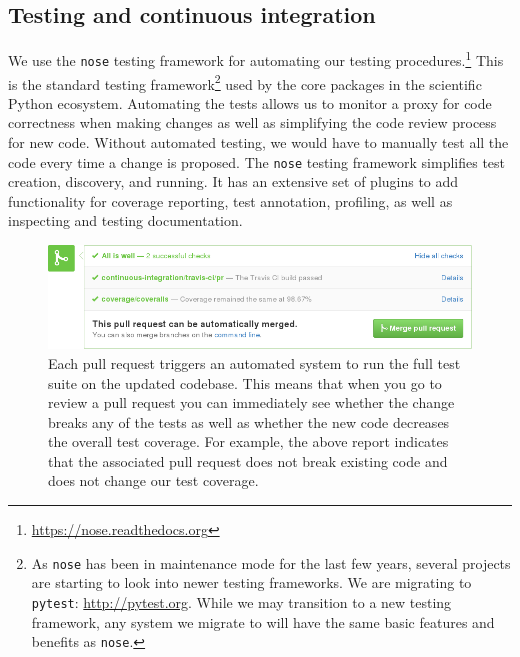 \documentclass[]{article}
\begin{document}
\subsection{\label{sec:test}Testing and continuous integration}

We use the \texttt{nose} testing framework for automating our testing
procedures.\footnote{\url{https://nose.readthedocs.org}}
This is the standard testing framework\footnote{As \texttt{nose} has been in
maintenance mode for the last few years, several projects are starting to look
into newer testing frameworks.
We are migrating to \texttt{pytest}: \url{http://pytest.org}.
While we may transition to a new testing framework, any system we
migrate to will have the same basic features and benefits as \texttt{nose}.}
used by the core packages in the scientific Python ecosystem.
Automating the tests allows us to monitor a proxy for code correctness when
making changes as well as simplifying the code review process for new code.
Without automated testing, we would have to manually test all the code every
time a change is proposed.
The \texttt{nose} testing framework simplifies test creation, discovery, and
running.
It has an extensive set of plugins to add functionality for coverage reporting,
test annotation, profiling, as well as inspecting and testing documentation.

\begin{figure}
  \begin{centering}
    \includegraphics[width=\textwidth]{pull-request-ci.png}\par
  \end{centering}

  \caption{\label{fig:pull-request}
  \small
    Each pull request triggers an automated system to run the  full test suite on
    the updated codebase.
    This means that when you go to review a pull request you can immediately see
    whether the change breaks any of the tests as well as whether the new
    code decreases the overall test coverage.
    For example, the above report indicates that the associated pull request does not
    break existing code and does not change our test coverage.}
\end{figure}
\end{document}
